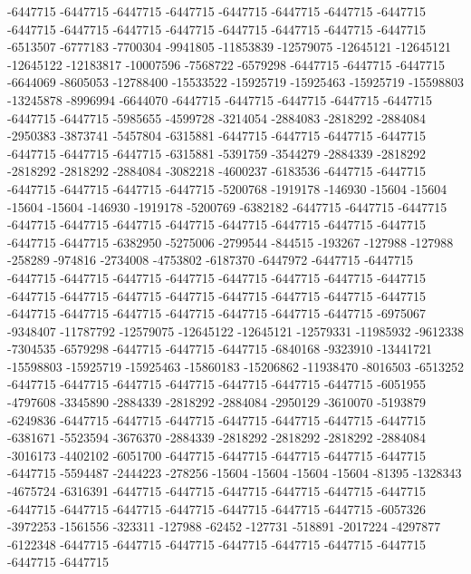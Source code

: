 -6447715 -6447715 -6447715 -6447715 -6447715 -6447715 -6447715 -6447715 -6447715 -6447715 -6447715 -6447715 -6447715 -6447715 -6447715 -6447715 -6513507 -6777183 -7700304 -9941805 -11853839 -12579075 -12645121 -12645121 -12645122 -12183817 -10007596 -7568722 -6579298 -6447715 -6447715 -6447715 -6644069 -8605053 -12788400 -15533522 -15925719 -15925463 -15925719 -15598803 -13245878 -8996994 -6644070 -6447715 -6447715 -6447715 -6447715 -6447715 -6447715 -6447715 -5985655 -4599728 -3214054 -2884083 -2818292 -2884084 -2950383 -3873741 -5457804 -6315881 -6447715 -6447715 -6447715 -6447715 -6447715 -6447715 -6447715 -6315881 -5391759 -3544279 -2884339 -2818292 -2818292 -2818292 -2884084 -3082218 -4600237 -6183536 -6447715 -6447715 -6447715 -6447715 -6447715 -6447715 -5200768 -1919178 -146930 -15604 -15604 -15604 -15604 -146930 -1919178 -5200769 -6382182 -6447715 -6447715 -6447715 -6447715 -6447715 -6447715 -6447715 -6447715 -6447715 -6447715 -6447715 -6447715 -6447715 -6382950 -5275006 -2799544 -844515 -193267 -127988 -127988 -258289 -974816 -2734008 -4753802 -6187370 -6447972 -6447715 -6447715 -6447715 -6447715 -6447715 -6447715 -6447715
-6447715 -6447715 -6447715 -6447715 -6447715 -6447715 -6447715 -6447715 -6447715 -6447715 -6447715 -6447715 -6447715 -6447715 -6447715 -6447715 -6447715 -6447715 -6975067 -9348407 -11787792 -12579075 -12645122 -12645121 -12579331 -11985932 -9612338 -7304535 -6579298 -6447715 -6447715 -6447715 -6840168 -9323910 -13441721 -15598803 -15925719 -15925463 -15860183 -15206862 -11938470 -8016503 -6513252 -6447715 -6447715 -6447715 -6447715 -6447715 -6447715 -6447715 -6051955 -4797608 -3345890 -2884339 -2818292 -2884084 -2950129 -3610070 -5193879 -6249836 -6447715 -6447715 -6447715 -6447715 -6447715 -6447715 -6447715 -6381671 -5523594 -3676370 -2884339 -2818292 -2818292 -2818292 -2884084 -3016173 -4402102 -6051700 -6447715 -6447715 -6447715 -6447715 -6447715 -6447715 -5594487 -2444223 -278256 -15604 -15604 -15604 -15604 -81395 -1328343 -4675724 -6316391 -6447715 -6447715 -6447715 -6447715 -6447715 -6447715 -6447715 -6447715 -6447715 -6447715 -6447715 -6447715 -6447715 -6057326 -3972253 -1561556 -323311 -127988 -62452 -127731 -518891 -2017224 -4297877 -6122348 -6447715 -6447715 -6447715 -6447715 -6447715 -6447715 -6447715 -6447715 -6447715

